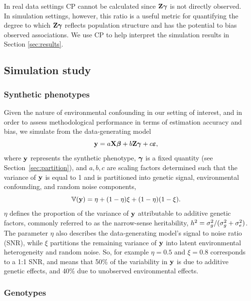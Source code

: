 In real data settings CP cannot be calculated since $\mathbf{Z} \boldsymbol{\gamma}$ is not directly observed. In simulation settings, however, this ratio is a useful metric for quantifying the degree to which $\mathbf{Z} \boldsymbol{\gamma}$ reflects population structure and has the potential to bias observed associations. We use CP to help interpret the simulation results in Section \ref{sec:results}. %

\subsection{Simulation study}

\subsubsection{Synthetic phenotypes}

Given the nature of environmental confounding in our setting of interest, and in order to assess methodological performance in terms of estimation accuracy and bias, we simulate from the data-generating model
\begin{equation}
    \label{eqn:sim}
    \mathbf{y} = a \mathbf{X} \boldsymbol{\beta}{} + b \mathbf{Z} \boldsymbol{\gamma} + c \boldsymbol{\varepsilon}{},
\end{equation}
where $\mathbf{y}$ represents the synthetic phenotype, $\boldsymbol{\gamma}$ is a fixed quantity (see Section~\ref{sec:partition}), and $a, b, c$ are scaling factors determined such that the variance of $\mathbf{y}$ is equal to 1 and is partitioned into genetic signal, environmental confounding, and random noise components,
\begin{equation}
    \label{eqn:parition_y}
    \mathbb{V}(\mathbf{y}) = \eta + (1 - \eta) \xi + (1-\eta)(1-\xi).
\end{equation}
$\eta$ defines the proportion of the variance of $\mathbf{y}$ attributable to additive genetic factors, commonly referred to as the narrow-sense heritability, $h^2 = \sigma^2_g/(\sigma^2_g + \sigma^2_e)$. The parameter $\eta$ also describes the data-generating model's signal to noise ratio (SNR), while $\xi$ partitions the remaining variance of $\mathbf{y}$ into latent environmental heterogeneity and random noise. So, for example $\eta = 0.5$ and $\xi = 0.8$ corresponds to a 1:1 SNR, and means that 50\% of the variability in $\mathbf{y}$ is due to additive genetic effects, and 40\% due to unobserved environmental effects. 

\subsubsection{Genotypes}
\label{sec:subpopulation_structure}

